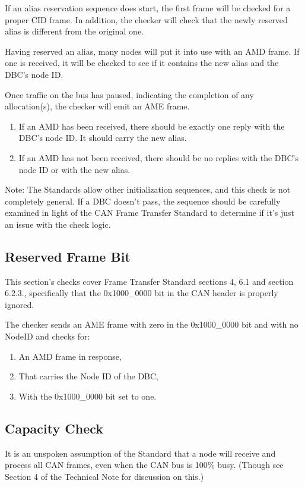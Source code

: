 If an alias reservation sequence does start, 
the first frame will be checked for a proper CID frame.  
In addition, the checker will check that the 
newly reserved alias is different from the original one.

Having reserved an alias, many nodes will put it into use with an AMD frame. 
If one is received, it will be checked to see if it contains the new alias
and the DBC's node ID.

Once traffic on the bus has paused, indicating the completion of 
any allocation(s), the checker will emit an AME frame.
\begin{enumerate}
\item If an AMD has been received, there should be exactly one
        reply with the DBC's node ID.  It should carry the new alias.
\item If an AMD has not been received, there should be no 
        replies with the DBC's node ID or with the new alias.
\end{enumerate}

Note: The Standards allow other initialization sequences, and this check
is not completely general.  If a DBC doesn't pass, the sequence should
be carefully examined in light of the CAN Frame Transfer Standard
to determine if it's just an issue with the check logic.
\subsection{Reserved Frame Bit}

This section's checks cover Frame Transfer Standard sections 4, 6.1 and section 6.2.3., 
specifically that the 0x1000\_0000 bit in the CAN header is properly
ignored.

The checker sends an AME frame with zero in the 0x1000\_0000 bit
and with no NodeID and checks for:
\begin{enumerate}
\item An AMD frame in response,
\item That carries the Node ID of the DBC,
\item With the 0x1000\_0000 bit set to one.
\end{enumerate}

\subsection{Capacity Check}

It is an unspoken assumption of the Standard that a node will receive and
process all CAN frames, even when the CAN bus is 100\% busy. (Though see Section 4
of the Technical Note for discussion on this.) 

